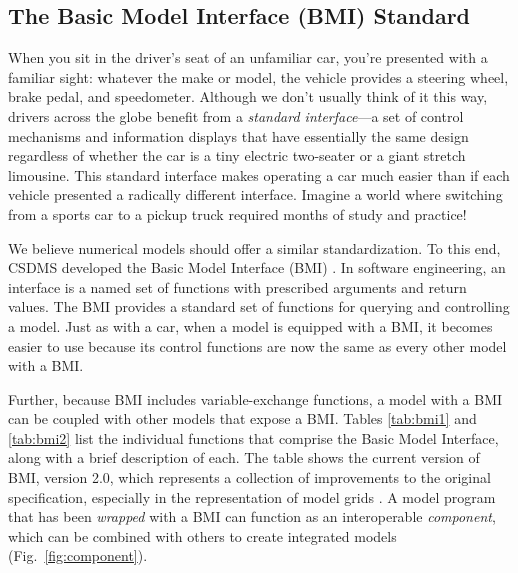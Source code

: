 \documentclass[journal abbreviation, manuscript]{copernicus}
\begin{document}
\subsection{The Basic Model Interface (BMI) Standard}
\label{sec:bmi}




When you sit in the driver's seat of an unfamiliar car,
you're presented with a familiar sight:
whatever the make or model,
the vehicle provides
a steering wheel, brake pedal, and speedometer.
Although we don't usually think of it this way,
drivers across the globe benefit
from a \textit{standard interface}---a set of control mechanisms and information displays
that have %
essentially the same design
regardless of whether the car
is a tiny electric two-seater or a giant stretch limousine.
This standard interface makes operating a car much easier
than if each vehicle presented a radically different interface.
Imagine a world where switching from a sports car to a pickup truck
required months of study and practice!

We believe %
numerical models should offer a similar standardization.
To this end, CSDMS
developed the Basic Model Interface (BMI) \citep{peckham2013component,hutton2020basic}.
In software engineering,
an interface is a named set of functions
with prescribed arguments and return values.
The BMI provides a standard set of functions
for querying and controlling a model.
Just as with a car,
when a model is equipped with a BMI,
it becomes easier to use
because its control functions are now the same as every other model with a BMI.

Further, because BMI includes variable-exchange functions,
a model with a BMI can be coupled with other models that expose a BMI.
Tables \ref{tab:bmi1} and \ref{tab:bmi2} list the individual functions
that comprise the Basic Model Interface,
along with a brief description of each.
The table shows the current version of BMI, version 2.0,
which represents a collection of improvements to the original specification,
especially in the representation of model grids \citep{hutton2020basic}. A model program that has been \textit{wrapped} with a BMI can function as an interoperable \textit{component}, which can be combined with others to create integrated models (Fig.~\ref{fig:component}).
\end{document}
